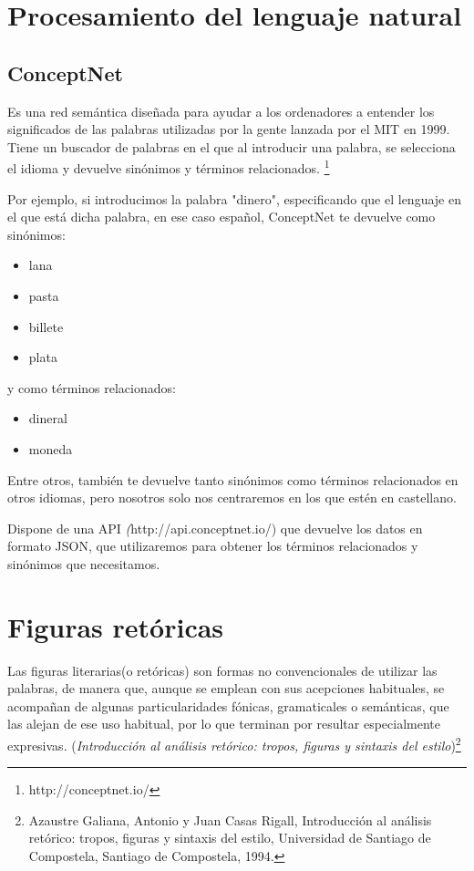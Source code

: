 \section{Procesamiento del lenguaje natural}
\subsection{ConceptNet} 

Es una red semántica diseñada para ayudar a los ordenadores a entender los significados de las palabras utilizadas por la gente lanzada por el MIT en 1999.
Tiene un buscador de palabras en el que al introducir una palabra, se selecciona el idioma y devuelve sinónimos y términos relacionados.
\footnote{http://conceptnet.io/}

Por ejemplo, si introducimos la palabra "dinero", especificando que el lenguaje en el que está dicha palabra, en ese caso español, ConceptNet te devuelve como sinónimos:
\begin{itemize}
	\item lana
	\item pasta
	\item billete
	\item plata
\end{itemize}
y como términos relacionados:
\begin{itemize}
	\item dineral
	\item moneda
\end{itemize}
Entre otros, también te devuelve tanto sinónimos como términos relacionados en otros idiomas, pero nosotros solo nos centraremos en los que estén en castellano.

Dispone de una API \textit({http://api.conceptnet.io/}) que devuelve los datos en formato JSON, que utilizaremos para obtener los términos relacionados y sinónimos que necesitamos.

\section{Figuras retóricas}

Las figuras literarias(o retóricas) son formas no convencionales de utilizar las palabras, de manera que, aunque se emplean con sus acepciones habituales, se acompañan de algunas particularidades fónicas, gramaticales o semánticas, que las alejan de ese uso habitual, por lo que terminan por resultar especialmente expresivas. (\textit {Introducción al análisis retórico: tropos, figuras y sintaxis del estilo})\footnote{Azaustre Galiana, Antonio y Juan Casas Rigall, Introducción al análisis retórico: tropos, figuras y sintaxis del estilo, Universidad de Santiago de Compostela, Santiago de Compostela, 1994.}

